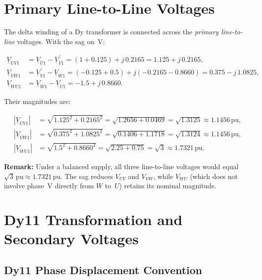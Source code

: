 \documentclass[a4paper,11pt]{article}
\begin{document}
\section{Primary Line-to-Line Voltages}
\label{sec:primary-ll}

The delta winding of a Dy transformer is connected across the
\emph{primary line-to-line} voltages.  With the sag on~V:

\begin{align}
\underline{V}_{UV1} &= \underline{V}_{U1} - \underline{V}_{V1}^{\,\prime}
   = (1+0.125) + j\,0.2165
   = 1.125 + j\,0.2165, \\[4pt]
\underline{V}_{VW1} &= \underline{V}_{V1}^{\,\prime} - \underline{V}_{W1}
   = (-0.125+0.5) + j(-0.2165-0.8660)
   = 0.375 - j\,1.0825, \\[4pt]
\underline{V}_{WU1} &= \underline{V}_{W1} - \underline{V}_{U1}
   = -1.5 + j\,0.8660.
\end{align}

Their magnitudes are:

\begin{align}
|\underline{V}_{UV1}| &= \sqrt{1.125^2 + 0.2165^2}
   = \sqrt{1.2656 + 0.0469} = \sqrt{1.3125} \approx 1.1456\,\mathrm{pu},\\[4pt]
|\underline{V}_{VW1}| &= \sqrt{0.375^2 + 1.0825^2}
   = \sqrt{0.1406 + 1.1718} = \sqrt{1.3124} \approx 1.1456\,\mathrm{pu},\\[4pt]
|\underline{V}_{WU1}| &= \sqrt{1.5^2 + 0.8660^2}
   = \sqrt{2.25 + 0.75} = \sqrt{3} \approx 1.7321\,\mathrm{pu}.
\end{align}

\noindent \textbf{Remark:} Under a balanced supply, all three line-to-line
voltages would equal $\sqrt{3}\,\mathrm{pu} \approx 1.7321\,\mathrm{pu}$.
The sag reduces $V_{UV}$ and $V_{VW}$, while $V_{WU}$ (which does not involve
phase~V directly from $W$ to~$U$) retains its nominal magnitude.

\section{Dy11 Transformation and Secondary Voltages}
\label{sec:secondary}

\subsection{Dy11 Phase Displacement Convention}
\end{document}
